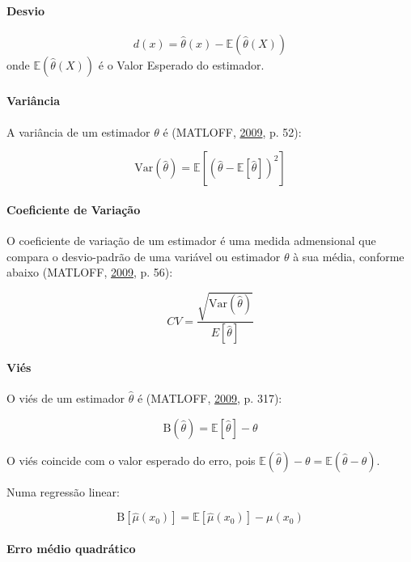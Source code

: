\documentclass[a4paper, 12pt]{article}
\let\oldparagraph\paragraph
\renewcommand{\paragraph}[1]{\oldparagraph{#1}\mbox{}}
\begin{document}
\paragraph{Desvio}\label{desvio}

\[d(x) = \hat{\theta}(x) - \mathbb{E}(\hat{\theta}(X))\] onde
\(\mathbb{E}(\hat{\theta}(X))\) é o Valor Esperado do estimador.

\paragraph{Variância}\label{variancia}

A variância de um estimador \(\theta\) é (MATLOFF,
\protect\hyperlink{ref-matloff2009}{2009}, p. 52):

\[\text{Var}(\hat{\theta}) = \mathbb{E}[(\hat{\theta} - \mathbb{E}[\hat{\theta}])^2]\]

\paragraph{Coeficiente de Variação}\label{coeficiente-de-variacao}

O coeficiente de variação de um estimador é uma medida admensional que
compara o desvio-padrão de uma variável ou estimador \(\theta\) à sua
média, conforme abaixo (MATLOFF,
\protect\hyperlink{ref-matloff2009}{2009}, p. 56):

\[CV = \frac{\sqrt{\text{Var}(\hat{\theta})}}{E[\hat{\theta}]}\]

\paragraph{Viés}\label{vies}

O viés de um estimador \(\hat{\theta}\) é (MATLOFF,
\protect\hyperlink{ref-matloff2009}{2009}, p. 317):

\[\text{B}(\hat{\theta}) = \mathbb{E}[\hat{\theta}] - \theta\]

O viés coincide com o valor esperado do erro, pois
\(\mathbb{E}(\hat{\theta}) - \theta = \mathbb{E}(\hat{\theta}-\theta)\).

Numa regressão linear:

\[\text{B}[\hat{\mu}(x_0)] = \mathbb{E}[\hat{\mu}(x_0)] - \mu(x_0)\]

\paragraph{Erro médio quadrático}\label{erro-medio-quadratico}
\end{document}
